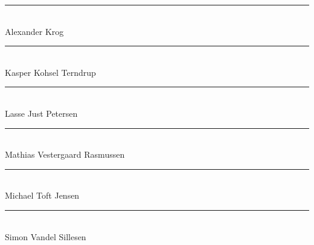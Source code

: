\thispagestyle{empty}
\vspace*{\fill}
\noindent
\sffamily
%
\rule{9cm}{1pt}\\
\vspace{1.5cm}
Alexander Krog\\
%
\rule{9cm}{1pt}\\
\vspace{1.5cm}
Kasper Kohsel Terndrup\\
%
\rule{9cm}{1pt}\\
\vspace{1.5cm}
Lasse Just Petersen\\
%
\rule{9cm}{1pt}\\
\vspace{1.5cm}
Mathias Vestergaard Rasmussen\\
%
\rule{9cm}{1pt}\\
\vspace{1.5cm}
Michael Toft Jensen\\
%
\rule{9cm}{1pt}\\
\vspace{1.5cm}
Simon Vandel Sillesen\\
%
\normalfont
\vspace*{\fill}